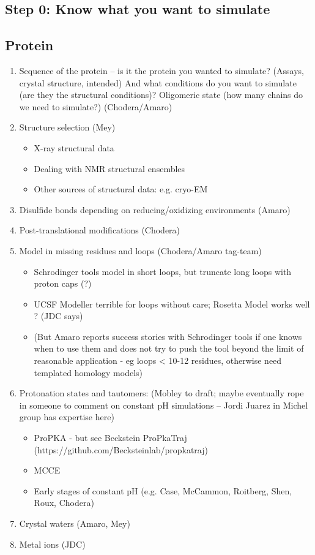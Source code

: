 \documentclass[9pt]{livecoms}
\begin{document}
\subsection{ Step 0: Know what you want to simulate }



\subsection{Protein} 

\begin{enumerate}
\item Sequence of the protein -- is it the protein you wanted to simulate? (Assays, crystal structure, intended) And what conditions do you want to simulate (are they the structural conditions)? Oligomeric state (how many chains do we need to simulate?) (Chodera/Amaro)
\item Structure selection (Mey) 
    \begin{itemize}
    \item  X-ray structural data
    \item Dealing with NMR structural ensembles
    \item Other sources of structural data: e.g. cryo-EM
    \end{itemize}
\item Disulfide bonds depending on reducing/oxidizing environments (Amaro)
\item Post-translational modifications (Chodera)
\item Model in missing residues and loops (Chodera/Amaro tag-team)
    \begin{itemize}
    \item Schrodinger tools model in short loops, but truncate long loops with proton caps (?)
    \item UCSF Modeller terrible for loops without care; Rosetta Model works well ? (JDC says)
    \item (But Amaro reports success stories with Schrodinger tools if one knows when to use them and does not try to push the tool beyond the limit of reasonable application - eg loops < 10-12 residues, otherwise need templated homology models)
    \end{itemize}
\item Protonation states and tautomers: (Mobley to draft; maybe eventually rope in someone to comment on constant pH simulations -- Jordi Juarez in Michel group has expertise here)
    \begin{itemize}
    \item ProPKA - but see Beckstein ProPkaTraj (https://github.com/Becksteinlab/propkatraj)
    \item MCCE
    \item Early stages of constant pH (e.g. Case, McCammon, Roitberg, Shen, Roux, Chodera)
    \end{itemize}
\item Crystal waters (Amaro, Mey)
\item Metal ions (JDC)


\end{enumerate}
\end{document}
